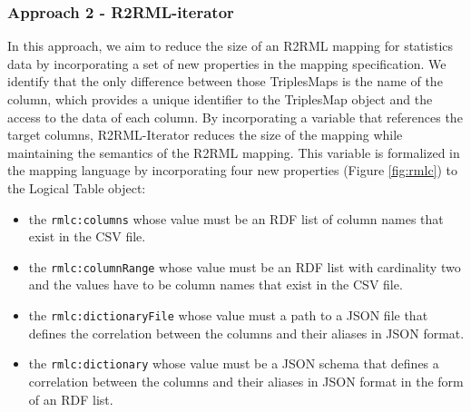 \subsubsection{Approach 2 - R2RML-iterator}
In this approach, we aim to reduce the size of an R2RML mapping for statistics data by incorporating a set of new properties in the mapping specification. We identify that the only difference between those TriplesMaps is the name of the column, which provides a unique identifier to the TriplesMap object and the access to the data of each column. By incorporating a variable that references the target columns, R2RML-Iterator reduces the size of the mapping while maintaining the semantics of the R2RML mapping. This variable is formalized in the mapping language by incorporating four new properties (Figure \ref{fig:rmlc}) to the Logical Table object:

\begin{itemize}
\item the \texttt{rmlc:columns} whose value must be an RDF list of column names that exist in the CSV file.
\item the \texttt{rmlc:columnRange} whose value must be an RDF list with cardinality two and the values have to be column names that exist in the CSV file.
\item the \texttt{rmlc:dictionaryFile} whose value must a path to a JSON file that defines the correlation between the columns and their aliases in JSON format.
\item the \texttt{rmlc:dictionary} whose value must be a JSON schema that defines a correlation between the columns and their aliases in JSON format in the form of an RDF list.
\end{itemize}

